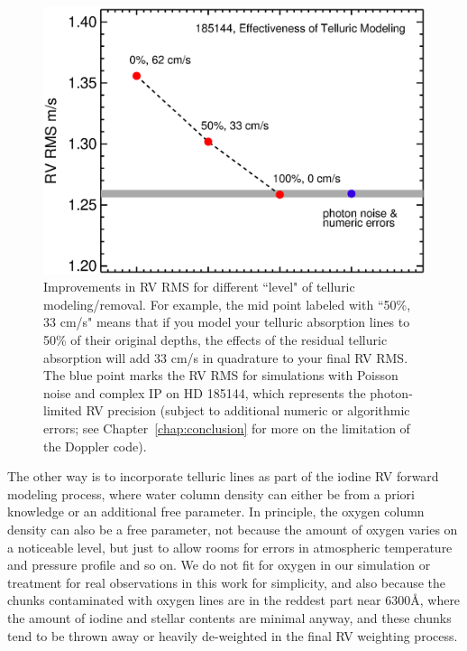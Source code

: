 \begin{figure}
\includegraphics[scale=0.5]{telluric/neid.eps} 
\caption{Improvements in RV RMS for different ``level" of telluric
  modeling/removal. For example, the mid point labeled with ``50\%, 33 cm/s"
  means that if you model your telluric absorption lines to 50\% of
  their original depths, the effects of the residual telluric
  absorption will add 33 cm/s in quadrature to your final RV RMS. The
  blue point marks the RV RMS for simulations with Poisson noise and
  complex IP on HD 185144, which represents the photon-limited RV
  precision (subject to additional numeric or algorithmic errors; see
  Chapter~\ref{chap:conclusion} for more on the limitation of the
  Doppler code).
\label{telluric:fig:neid}}
\end{figure}


The other way is to incorporate telluric lines as part of the iodine
RV forward modeling process, where water column density can either be
from a priori knowledge or an additional free parameter. In principle,
the oxygen column density can also be a free parameter, not because
the amount of oxygen varies on a noticeable level, but just to allow
rooms for errors in atmospheric temperature and pressure profile and
so on. We do not fit for oxygen in our simulation or treatment for
real observations in this work for simplicity, and also because the
chunks contaminated with oxygen lines are in the reddest part near
6300\AA, where the amount of iodine and stellar contents are minimal
anyway, and these chunks tend to be thrown away or heavily de-weighted
in the final RV weighting process.


